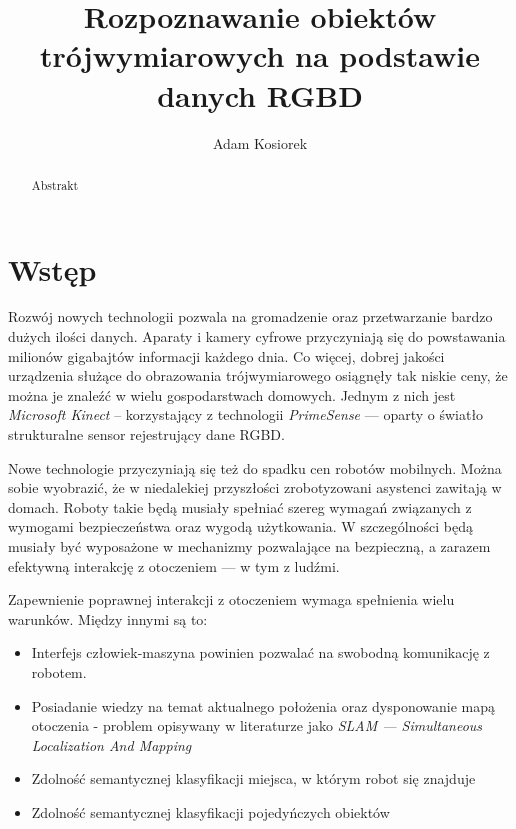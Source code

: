 \documentclass[a4paper,10pt,twocolumn]{article}
\title{Rozpoznawanie obiektów trójwymiarowych na podstawie danych RGBD}
\author{Adam Kosiorek}
\begin{document}
\maketitle

\begin{abstract}

Abstrakt

\end{abstract}

\section{Wstęp}

  Rozwój nowych technologii pozwala na gromadzenie oraz przetwarzanie bardzo dużych ilości danych. Aparaty i kamery cyfrowe przyczyniają się do powstawania milionów gigabajtów informacji każdego dnia. Co więcej, dobrej jakości urządzenia służące do obrazowania trójwymiarowego osiągnęły tak niskie ceny, że można je znaleźć w wielu gospodarstwach domowych. Jednym z nich jest \textit{Microsoft Kinect} -- korzystający z technologii \textit{PrimeSense} --- oparty o światło strukturalne sensor rejestrujący dane RGBD.
  
  Nowe technologie przyczyniają się też do spadku cen robotów mobilnych. Można sobie wyobrazić, że w niedalekiej przyszłości zrobotyzowani asystenci zawitają w domach. Roboty takie będą musiały spełniać szereg wymagań związanych z wymogami bezpieczeństwa oraz wygodą użytkowania. W szczególności będą musiały być wyposażone w mechanizmy pozwalające na bezpieczną, a zarazem efektywną interakcję z otoczeniem --- w tym z ludźmi. 
  
  Zapewnienie poprawnej interakcji z otoczeniem wymaga spełnienia wielu warunków. Między innymi są to: 
  \begin{itemize}
   \item Interfejs człowiek-maszyna powinien pozwalać na swobodną komunikację z robotem.
   \item Posiadanie wiedzy na temat aktualnego położenia oraz dysponowanie mapą otoczenia - problem opisywany w literaturze jako \textit{SLAM --- Simultaneous Localization And Mapping}
   \item Zdolność semantycznej klasyfikacji miejsca, w którym robot się znajduje
   \item Zdolność semantycznej klasyfikacji pojedyńczych obiektów   
  \end{itemize}
  
\end{document}
